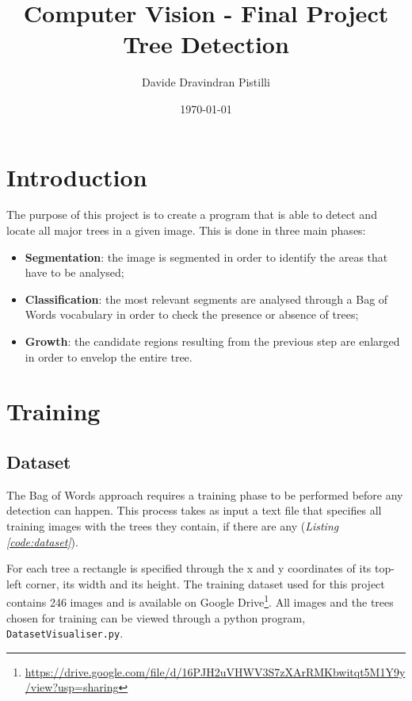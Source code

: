 \documentclass{article}
\title{Computer Vision - Final Project \\ Tree Detection} %
\author{Davide Dravindran Pistilli} %
\date{\today} %
\begin{document}
\maketitle %

\section{Introduction}
The purpose of this project is to create a program that is able to detect and locate all major trees in a given image. This is done in three main phases:
\begin{itemize}
\item \textbf{Segmentation}: the image is segmented in order to identify the areas that have to be analysed;
\item \textbf{Classification}: the most relevant segments are analysed through a Bag of Words vocabulary in order to check the presence or absence of trees;
\item \textbf{Growth}: the candidate regions resulting from the previous step are enlarged in order to envelop the entire tree.
\end{itemize}

\section{Training}
\subsection{Dataset}
The Bag of Words approach requires a training phase to be performed before any detection can happen. This process takes as input a text file that specifies all training images with the trees they contain, if there are any (\textit{Listing \ref{code:dataset}}).

\lstset{style=DatasetConfig}


For each tree a rectangle is specified through the x and y coordinates of its top-left corner, its width and its height.
The training dataset used for this project contains 246 images and is available on Google Drive\footnote{\url{https://drive.google.com/file/d/16PJH2uVHWV3S7zXArRMKbwitqt5M1Y9y/view?usp=sharing}}.
All images and the trees chosen for training can be viewed through a python program, \texttt{DatasetVisualiser.py}.
\end{document}
